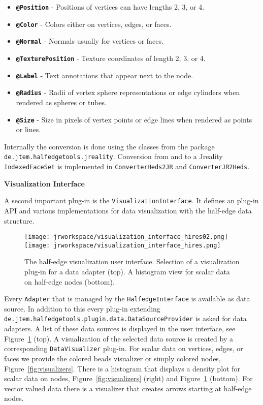 \documentclass[Thesis.tex]{subfiles}
\begin{document}
\begin{itemize}
\item {\tt\bf @Position} - Positions of vertices can have lengths 2, 3, or 4.
\item {\tt\bf @Color} - Colors either on vertices, edges, or faces.
\item {\tt\bf @Normal} - Normals usually for vertices or faces.
\item {\tt\bf @TexturePosition} - Texture coordinates of length 2, 3, or 4.
\item {\tt\bf @Label} - Text annotations that appear next to the node.
\item {\tt\bf @Radius} - Radii of vertex sphere representations or edge cylinders when rendered
as spheres or tubes.
\item {\tt\bf @Size} - Size in pixels of vertex points or edge lines when rendered as points or lines.
\end{itemize}

Internally the conversion is done using the classes from the package 
{\tt de.jtem.halfedge\-tools.jreality}. Conversion from and to a {\sc Jreality} {\tt IndexedFaceSet}
is implemented in {\tt ConverterHeds2JR} and {\tt ConverterJR2Heds}.

{\bf Visualization Interface}

A second important plug-in is the {\tt Visuali\-zation\-Inter\-face}. It defines
an plug-in API and various implementations for data visualization with the half-edge data structure. 


\begin{figure}
	\centering
	\texttt{[image: jrworkspace/visualization\_interface\_hires02.png]}
	\texttt{[image: jrworkspace/visualization\_interface\_hires.png]}
	\caption[Visualization Interface]{The half-edge visualization user interface. Selection of a visualization
		plug-in for a data adapter (top). A histogram view for scalar data on half-edge nodes (bottom).}
	\label{fig:visualization_interface}
\end{figure}

Every {\tt Adapter} that is managed by the {\tt HalfedgeInterface} is available as data source. In 
addition to this every plug-in extending {\tt de.jtem.half\-edgetools.plugin.data.Data\-Source\-Provider} 
is asked for data adapters. A list of these data sources is displayed in the user interface, see 
Figure~\ref{fig:visualization_interface} (top). A visualization of the selected data source is created by a
corresponding {\tt DataVisualizer} plug-in. For scalar data on vertices, edges, or faces we provide the 
colored beads visualizer or simply colored nodes, Figure~\ref{fig:visualizers}. There is a histogram that displays a density
plot for scalar data on nodes, Figure~\ref{fig:visualizers} (right) and Figure~\ref{fig:visualization_interface} (bottom). For vector valued data 
there is a visualizer that creates arrows starting at half-edge nodes.
\end{document}
